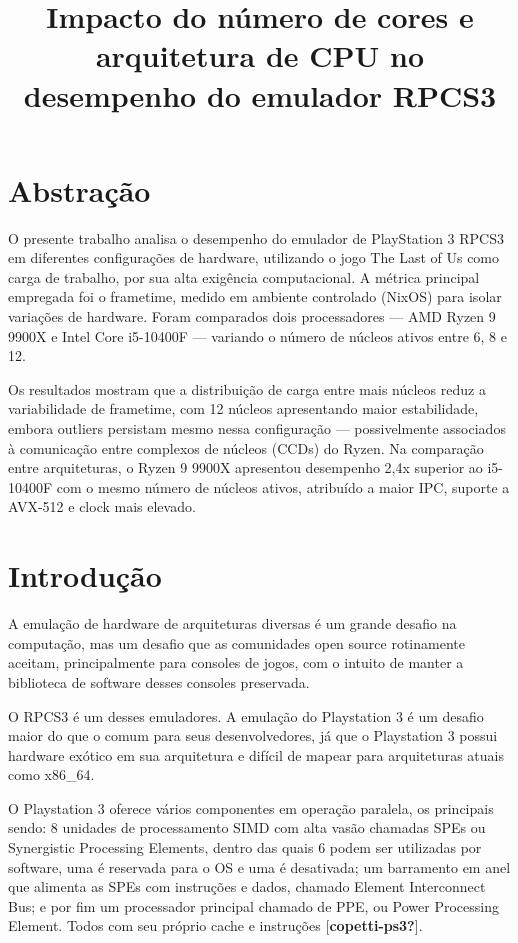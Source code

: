 \documentclass{acm_proc_article-sp}
\title{Impacto do número de cores e arquitetura de CPU no desempenho do
emulador RPCS3}
\author{
\alignauthor Victor Furusho Vally \\
        \affaddr{Universidade Federal do Rio Grande do Sul}\\
       \email{}
\and \alignauthor Erick Schultz Ceresa \\
        \affaddr{Universidade Federal do Rio Grande do Sul}\\
       \email{}
\and \alignauthor Miguel Predebon Abichequer \\
        \affaddr{Universidade Federal do Rio Grande do Sul}\\
       \email{}
\and }
\date{}
\begin{document}
\maketitle


\section{Abstração}\label{abstrauxe7uxe3o}

O presente trabalho analisa o desempenho do emulador de PlayStation 3
RPCS3 em diferentes configurações de hardware, utilizando o jogo The
Last of Us como carga de trabalho, por sua alta exigência computacional.
A métrica principal empregada foi o frametime, medido em ambiente
controlado (NixOS) para isolar variações de hardware. Foram comparados
dois processadores --- AMD Ryzen 9 9900X e Intel Core i5-10400F ---
variando o número de núcleos ativos entre 6, 8 e 12.

Os resultados mostram que a distribuição de carga entre mais núcleos
reduz a variabilidade de frametime, com 12 núcleos apresentando maior
estabilidade, embora outliers persistam mesmo nessa configuração ---
possivelmente associados à comunicação entre complexos de núcleos (CCDs)
do Ryzen. Na comparação entre arquiteturas, o Ryzen 9 9900X apresentou
desempenho 2,4x superior ao i5-10400F com o mesmo número de núcleos
ativos, atribuído a maior IPC, suporte a AVX-512 e clock mais elevado.

\section{Introdução}\label{introduuxe7uxe3o}

A emulação de hardware de arquiteturas diversas é um grande desafio na
computação, mas um desafio que as comunidades open source rotinamente
aceitam, principalmente para consoles de jogos, com o intuito de manter
a biblioteca de software desses consoles preservada.

O RPCS3 é um desses emuladores. A emulação do Playstation 3 é um desafio
maior do que o comum para seus desenvolvedores, já que o Playstation 3
possui hardware exótico em sua arquitetura e difícil de mapear para
arquiteturas atuais como x86\_64.

O Playstation 3 oferece vários componentes em operação paralela, os
principais sendo: 8 unidades de processamento SIMD com alta vasão
chamadas SPEs ou Synergistic Processing Elements, dentro das quais 6
podem ser utilizadas por software, uma é reservada para o OS e uma é
desativada; um barramento em anel que alimenta as SPEs com instruções e
dados, chamado Element Interconnect Bus; e por fim um processador
principal chamado de PPE, ou Power Processing Element. Todos com seu
próprio cache e instruções {[}\textbf{copetti-ps3?}{]}.
\end{document}
